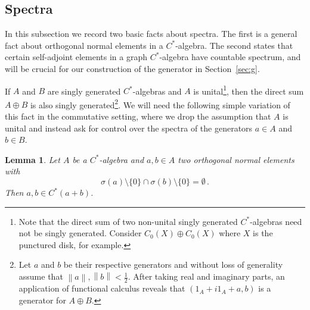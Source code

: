 \documentclass[12pt, a4paper]
{amsart}
\newcommand{\norm}[1]{\left\|#1\right\|} %
\newtheorem{lemma}[thm]{Lemma}
\theoremstyle{definition}
\theoremstyle{remark}
\numberwithin{equation}{section}
\newcommand{\Cstar}{\ensuremath{C^*}}
\begin{document}
\subsection{Spectra} In this subsection we record two basic facts about spectra. The first is a general fact about orthogonal normal elements in a $\Cstar$-algebra. The second states that certain self-adjoint elements in a graph $C^*$-algebra have countable spectrum, and will be crucial for our construction of the generator in Section~\ref{sec:g}.

If $A$ and $B$ are singly generated \Cstar-algebras and $A$ is unital\footnote{Note that the direct sum of two non-unital singly generated \Cstar-algebras need not be singly generated. Consider $C_0(X) \oplus C_0(X)$ where $X$ is the punctured disk, for example.}, then the direct sum $A\oplus B$ is also singly generated\footnote{Let $a$ and $b$ be their respective generators and without loss of generality assume that $\norm{a},\norm{b} < \frac{1}{2}$. After taking real and imaginary parts, an application of functional calculus reveals that $(1_A+ i1_A + a, b)$ is a generator for $A\oplus B$.}.
We will need the following simple variation of this fact in the commutative setting, where we drop the assumption that $A$ is unital and instead ask for control over the spectra of the generators $a \in A$ and $b \in B$.

\begin{lemma}
\label{lemma:disjoint-spectra}
    Let $A$ be a \Cstar-algebra and $a,b\in A$ two orthogonal normal elements with
    \begin{equation}\label{eq:disjoint-spectra}
        \sigma(a)\setminus\{0\} \cap \sigma(b)\setminus\{0\} =\emptyset\,.
    \end{equation} 
    Then $a,b\in\Cstar(a+b)$.
\end{lemma}
\end{document}
